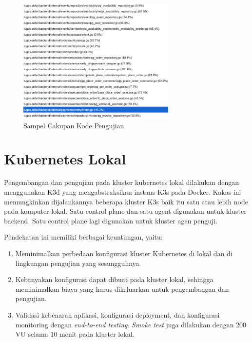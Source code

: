 \begin{figure}[H]
    \centering
    \includegraphics[width=0.7\textwidth]{resources/appendix/coverage.png}
    \caption{Sampel Cakupan Kode Pengujian}
    \label{fig:code-coverage}
\end{figure}

\pagebreak

\section{Kubernetes Lokal}

Pengembangan dan pengujian pada kluster kubernetes lokal dilakukan dengan menggunakan K3d yang mengabstraksikan instans K3s pada Docker. Kakas ini memungkinkan dijalankannya beberapa kluster K3s baik itu satu atau lebih node pada komputer lokal. Satu control plane dan satu agent digunakan untuk kluster backend. Satu control plane lagi digunakan untuk kluster agen penguji.

Pendekatan ini memiliki berbagai keuntungan, yaitu:

\begin{enumerate}
    \item Meminimalkan perbedaan konfigurasi kluster Kubernetes di lokal dan di lingkungan pengujian yang sesungguhnya.
    \item Kebanyakan konfigurasi dapat dibuat pada kluster lokal, sehingga meminimalkan biaya yang harus dikeluarkan untuk pengembangan dan pengujian.
    \item Validasi kebenaran aplikasi, konfigurasi deployment, dan konfigurasi monitoring dengan \textit{end-to-end testing}. \textit{Smoke test} juga dilakukan dengan 200 VU selama 10 menit pada kluster lokal.
\end{enumerate}

